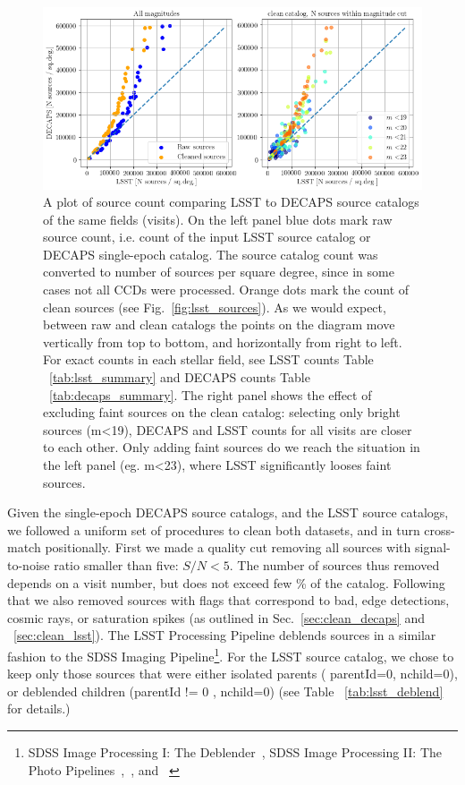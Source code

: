\documentclass[DM,lsstdraft,toc,usenatbib]{lsstdoc}
\begin{document}
\begin{figure}
\begin{centering}
\includegraphics[width=0.9\columnwidth]{figs/decaps_lsst_source_count.png}
\caption{A plot of source count comparing LSST to DECAPS source catalogs of the same fields (visits). On the left panel blue dots mark raw source count, i.e. count of the input LSST  source catalog or DECAPS single-epoch catalog. The source catalog count was converted to number of sources per square degree, since in some cases not all CCDs were processed.  Orange dots mark the count of clean sources (see Fig.~\ref{fig:lsst_sources}). As we would expect, between raw and clean catalogs the points on the diagram move vertically from top to bottom, and horizontally from right to left. For exact counts in each stellar field, see LSST counts Table ~\ref{tab:lsst_summary} and DECAPS counts Table ~\ref{tab:decaps_summary}.  The right panel shows the effect of excluding faint sources on the clean catalog: selecting only bright sources (m<19),  DECAPS and LSST counts for all visits are closer to each other. Only adding faint sources do we reach the situation in the left panel (eg. m<23), where LSST significantly looses faint sources. }
\label{fig:lsst_count_comparison}
\end{centering}
\end{figure} 


Given the single-epoch DECAPS source catalogs, and the LSST source catalogs, we followed a uniform set of procedures to clean both datasets, and in turn cross-match positionally. First we made a quality cut removing all sources with signal-to-noise ratio smaller than five:  $S/N < 5$. The number of sources thus removed depends on a visit number, but does not exceed few \% of the catalog. Following that we also removed sources with flags that correspond to bad, edge detections, cosmic rays, or saturation spikes (as outlined in Sec.~\ref{sec:clean_decaps} and ~\ref{sec:clean_lsst}). The LSST Processing Pipeline deblends sources in a similar fashion to the SDSS Imaging Pipeline\footnote{SDSS Image Processing I: The Deblender~\citep{lupton2005}, SDSS Image Processing II: The Photo Pipelines~\citep{lupton2001},~\citep{lupton2002}, and ~\citep{lupton2005a}}.   For the LSST source catalog,  we chose to keep only those sources that were either isolated parents ( parentId=0, nchild=0), or deblended children (parentId != 0 , nchild=0) (see Table ~\ref{tab:lsst_deblend} for details.)
\end{document}
